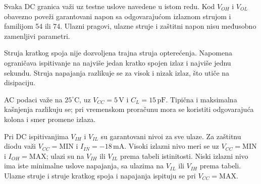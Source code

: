 Svaka DC granica važi uz testne uslove navedene u istom redu. Kod $V_{OH}$ i $V_{OL}$ obavezno poveži garantovani napon sa odgovarajućom izlaznom strujom i familijom 54 ili 74. Ulazni pragovi, ulazne struje i zaštitni napon nisu međusobno zamenljivi parametri.

Struja kratkog spoja nije dozvoljena trajna struja opterećenja. Napomena ograničava ispitivanje na najviše jedan kratko spojen izlaz i najviše jednu sekundu. Struja napajanja razlikuje se za visok i nizak izlaz, što utiče na disipaciju.

AC podaci važe na $25^\circ\mathrm C$, uz $V_{CC}=5\,\mathrm V$ i $C_L=15\,\mathrm{pF}$. Tipična i maksimalna kašnjenja razlikuju se; pri vremenskom proračunu mora se koristiti odgovarajuća kolona i smer promene izlaza.

Pri DC ispitivanjima $V_{IH}$ i $V_{IL}$ su garantovani nivoi za sve ulaze. Za zaštitnu diodu važi $V_{CC}=\mathrm{MIN}$ i $I_{IN}=-18\,\mathrm{mA}$. Visoki izlazni nivo meri se uz $V_{CC}=\mathrm{MIN}$ i $I_{OH}=\mathrm{MAX}$; ulazi su na $V_{IH}$ ili $V_{IL}$ prema tabeli istinitosti. Niski izlazni nivo ima iste minimalne uslove napajanja, sa ulazima na $V_{IL}$ ili $V_{IH}$ prema tabeli. Ulazne struje i struje kratkog spoja i napajanja ispituju se pri $V_{CC}=\mathrm{MAX}$.

